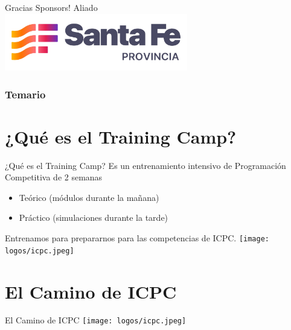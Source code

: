 \documentclass{beamer}
\begin{document}

\begin{frame}{Gracias Sponsors!}
    \centering
    Aliado\\
    \vspace{1cm}
    \includegraphics[width=0.6\textwidth,keepaspectratio]{logos/santa_fe_logo_v2.jpg}
\end{frame}


\begin{frame}
\frametitle{Temario}
\tableofcontents
\end{frame}


\section{¿Qué es el Training Camp?}

\begin{frame}{¿Qué es el Training Camp?}
Es un entrenamiento intensivo de Programación Competitiva de 2 semanas
\begin{itemize}
    \item Teórico (módulos durante la mañana) 
    \item Práctico (simulaciones durante la tarde)
\end{itemize}
Entrenamos para prepararnos para las competencias de ICPC.
    \centering
    \texttt{[image: logos/icpc.jpeg]}
\end{frame}

\section{El Camino de ICPC}

\begin{frame}{El Camino de ICPC}
    \centering
    \texttt{[image: logos/icpc.jpeg]}

\end{frame}
\end{document}
